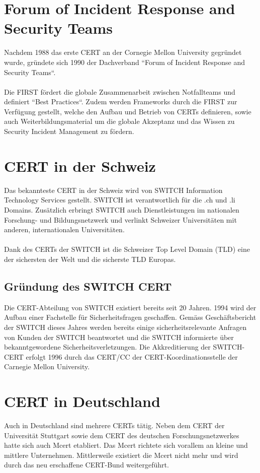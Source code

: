 \section{Forum of Incident Response and Security Teams}
Nachdem 1988 das erste CERT an der Cornegie Mellon University gegründet wurde, gründete sich 1990 der Dachverband ``Forum of Incident Response and Security Teams``. \\
\\
Die FIRST fördert die globale Zusammenarbeit zwischen Notfallteams und definiert ``Best Practices``. Zudem werden Frameworks durch die FIRST zur Verfügung gestellt, welche den Aufbau und Betrieb von CERTs definieren, sowie auch Weiterbildungsmaterial um die globale Akzeptanz und das Wissen zu Security Incident Management zu fördern.

\section{CERT in der Schweiz}
Das bekannteste CERT in der Schweiz wird von SWITCH Information Technology Services gestellt. SWITCH ist verantwortlich für die .ch und .li Domains. Zusätzlich erbringt SWITCH auch Dienstleistungen im nationalen Forschung- und Bildungsnetzwerk und verlinkt Schweizer Universitäten mit anderen, internationalen Universitäten.\\
\\
Dank des CERTs der SWITCH ist die Schweizer Top Level Domain (TLD) eine der sichersten der Welt und die sicherste TLD Europas. ~\citep{switch}

\subsection{Gründung des SWITCH CERT}
Die CERT-Abteilung von SWITCH existiert bereits seit 20 Jahren. 1994 wird der Aufbau einer Fachstelle für Sicherheitsfragen geschaffen. Gemäss Geschäftsbericht der SWITCH dieses Jahres werden bereits einige sicherheitsrelevante Anfragen von Kunden der SWITCH beantwortet und die SWITCH informierte über bekanntgewordene Sicherheitsverletzungen. Die Akkreditierung der SWITCH-CERT erfolgt 1996 durch das CERT/CC der CERT-Koordinationsstelle der Carnegie Mellon University.

\section{CERT in Deutschland}
Auch in Deutschland sind mehrere CERTs tätig. Neben dem CERT der Universität Stuttgart sowie dem CERT des deutschen Forschungsnetzwerkes hatte sich auch Mcert etabliert. Das Mcert richtete sich vorallem an kleine und mittlere Unternehmen. Mittlerweile existiert die Mcert nicht mehr und wird durch das neu erschaffene CERT-Bund weitergeführt.

